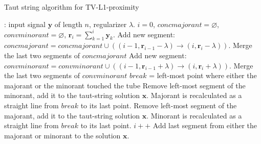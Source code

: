 \documentclass[twoside,11pt]{article}
\newcommand{\vr}{\bm{r}}       \newcommand{\vrh}{\hat{\bm{r}}}        \newcommand{\rh}{\hat{r}}    \newcommand{\vrt}{\tilde{\bm{r}}}       \newcommand{\rt}{\tilde{r}}
\newcommand{\vx}{\bm{x}}       \newcommand{\vxh}{\hat{\bm{x}}}        \newcommand{\xh}{\hat{x}}    \newcommand{\vxt}{\tilde{\bm{x}}}       \newcommand{\xt}{\tilde{x}}
\newcommand{\vy}{\bm{y}}       \newcommand{\vyh}{\hat{\bm{y}}}        \newcommand{\yh}{\hat{y}}    \newcommand{\vyt}{\tilde{\bm{y}}}       \newcommand{\yt}{\tilde{y}}
\numberwithin{equation}{section}
\numberwithin{theorem}{section}
\begin{document}
\begin{algorithm}[t]\small
 \caption{\small Taut string algorithm for TV-L1-proximity}
 \label{algTV1classicTautString}
 \begin{algorithmic}[1]
   : input signal $\vy$ of length $n$, regularizer $\lambda$.
    $i=0$, $concmajorant = \varnothing$, $convminorant = \varnothing$, $\vr_i = \sum_{k=1}^i \vy_k$.
      \State Add new segment: $concmajorant = concmajorant \cup \left( (i-1, \vr_{i-1}-\lambda) \rightarrow (i, \vr_i-\lambda) \right)$.
	\State Merge the last two segments of $concmajorant$
      \EndWhile
      \State Add new segment: $convminorant = convminorant \cup \left( (i-1, \vr_{i-1}+\lambda) \rightarrow (i, \vr_i+\lambda) \right)$.
	\State Merge the last two segments of $convminorant$
      \EndWhile
        \State $break$ = left-most point where either the majorant or the minorant touched the tube
          \State Remove left-most segment of the minorant, add it to the taut-string solution $\vx$.
          \State Majorant is recalculated as a straight line from $break$ to its last point.
        \EndIf
          \State Remove left-most segment of the majorant, add it to the taut-string solution $\vx$.
          \State Minorant is recalculated as a straight line from $break$ to its last point.
        \EndIf
      \EndIf
      \State $i++$
  \EndWhile
  \State Add last segment from either the majorant or minorant to the solution $\vx$.
 \end{algorithmic}
\end{algorithm}
\end{document}
